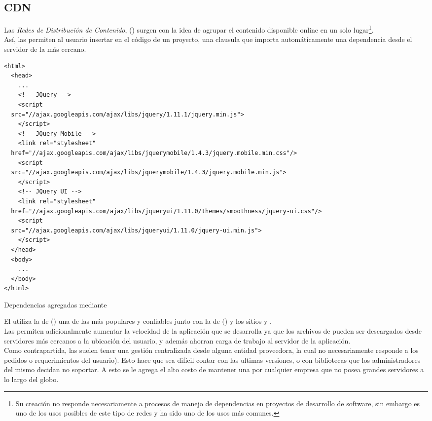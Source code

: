 \subsection{CDN}
\label{subsec:depmgmnt:jvm_dev:cdns}

Las \emph{Redes de Distribución de Contenido}, (\cdn) surgen con la idea de agrupar el contenido disponible online en un solo lugar\footnote{
	Su creación no responde necesariamente a procesos de manejo de dependencias
	en proyectos de desarrollo de software, sin embargo es uno de los usos
	posibles de este tipo de redes y ha sido uno de los usos más comunes.
}.\\
Así, las \cdn permiten al usuario insertar en el código \html de un proyecto, 
una clausula que importa automáticamente una dependencia desde el 
servidor de la \cdn más cercano.\\

\begin{listing}[ht]
\begin{verbatim}
<html>
  <head>
    ...
    <!-- JQuery -->
    <script
  src="//ajax.googleapis.com/ajax/libs/jquery/1.11.1/jquery.min.js">
    </script>
    <!-- JQuery Mobile -->
    <link rel="stylesheet"
  href="//ajax.googleapis.com/ajax/libs/jquerymobile/1.4.3/jquery.mobile.min.css"/>
    <script
  src="//ajax.googleapis.com/ajax/libs/jquerymobile/1.4.3/jquery.mobile.min.js">
    </script>
    <!-- JQuery UI -->
    <link rel="stylesheet" 
  href="//ajax.googleapis.com/ajax/libs/jqueryui/1.11.0/themes/smoothness/jquery-ui.css"/>
    <script
  src="//ajax.googleapis.com/ajax/libs/jqueryui/1.11.0/jquery-ui.min.js">
    </script>
  </head>
  <body>
    ...
  </body>
</html>
\end{verbatim}
\caption{Dependencias agregadas mediante \cdn}
\label{code:depmgmnt:cdn:cdn_deps}
\end{listing}

El  utiliza la \cdn de 
\citeauthor{GoogleCDN:ONLINE} () una de las más 
populares y confiables junto con la de \citeauthor{MicrosoftCDN:ONLINE} 
() y los sitios  y 
.\\
Las \cdns permiten adicionalmente aumentar la velocidad de la aplicación que se 
desarrolla ya que los archivos de \dependency pueden ser descargados desde 
servidores más cercanos a la ubicación del usuario, y además ahorran carga de 
trabajo al servidor de la aplicación.\\
Como contrapartida, las \cdns suelen tener una gestión centralizada desde 
alguna entidad proveedora, la cual no necesariamente responde a los pedidos o requerimientos del usuario). Esto hace que sea difícil contar con las ultimas 
versiones, o con bibliotecas que los administradores del mismo decidan no 
soportar. A esto se le agrega el alto costo de mantener una \cdn por cualquier 
empresa que no posea grandes servidores a lo largo del globo.

